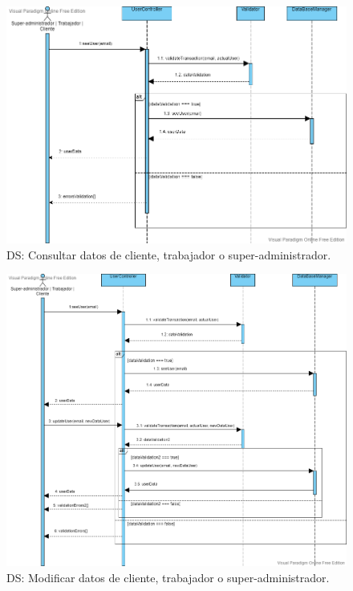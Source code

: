 \begin{figure}[H]
  \centering
  \includegraphics[scale=0.42]{images/Consultar_Datos_Usuario.png}
  \caption{DS: Consultar datos de cliente, trabajador o super-administrador.}
  \label{DS1}
\end{figure}

\begin{figure}[H]
  \centering
  \includegraphics[scale=0.38]{images/Modificar_Datos_Usuario.png}
  \caption{DS: Modificar datos de cliente, trabajador o super-administrador.}
  \label{DS1}
\end{figure}


